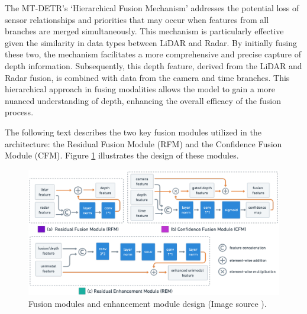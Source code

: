 \documentclass[report.tex]{subfiles}
\begin{document}
    The MT-DETR's `Hierarchical Fusion Mechanism' addresses the potential loss of sensor relationships and priorities that may occur when features from all branches are merged simultaneously. This mechanism is particularly effective given the similarity in data types between LiDAR and Radar. By initially fusing these two, the mechanism facilitates a more comprehensive and precise capture of depth information. Subsequently, this depth feature, derived from the LiDAR and Radar fusion, is combined with data from the camera and time branches. This hierarchical approach in fusing modalities allows the model to gain a more nuanced understanding of depth, enhancing the overall efficacy of the fusion process.


    The following text describes the two key fusion modules utilized in the architecture: the Residual Fusion Module (RFM) and the Confidence Fusion Module (CFM). Figure \ref{fig:mt_detr_fusion_modules} illustrates the design of these modules.

    \begin{figure}[h]
        \centering
        \includegraphics[width=1.0\textwidth]{images/methods/mtdetr/fusion_modules.png}
        \caption{Fusion modules and enhancement module design (Image source \cite{chu2023mt}).}
        \label{fig:mt_detr_fusion_modules}
    \end{figure}

\end{document}
